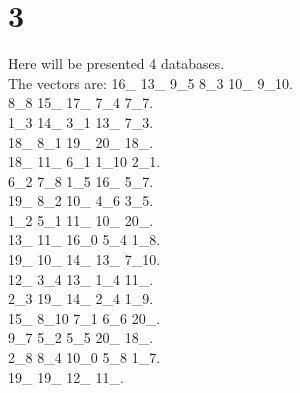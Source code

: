 \chapter{3}
\indent Here will be presented 4 databases.\\
The vectors are:
16\_ 13\_ 9\_5 8\_3 10\_ 9\_10.\\8\_8 15\_ 17\_ 7\_4 7\_7.\\1\_3 14\_ 3\_1 13\_ 7\_3.\\18\_ 8\_1 19\_ 20\_ 18\_.\\18\_ 11\_ 6\_1 1\_10 2\_1.\\6\_2 7\_8 1\_5 16\_ 5\_7.\\19\_ 8\_2 10\_ 4\_6 3\_5.\\1\_2 5\_1 11\_ 10\_ 20\_.\\13\_ 11\_ 16\_0 5\_4 1\_8.\\19\_ 10\_ 14\_ 13\_ 7\_10.\\12\_ 3\_4 13\_ 1\_4 11\_.\\2\_3 19\_ 14\_ 2\_4 1\_9.\\15\_ 8\_10 7\_1 6\_6 20\_.\\9\_7 5\_2 5\_5 20\_ 18\_.\\2\_8 8\_4 10\_0 5\_8 1\_7.\\19\_ 19\_ 12\_ 11\_.\\